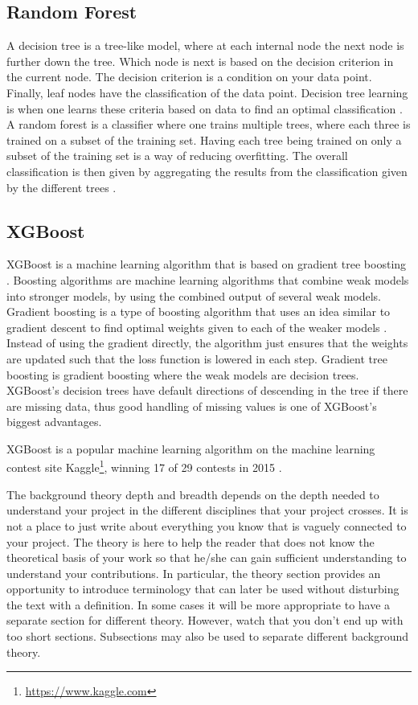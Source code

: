 \subsection{Random Forest}
\label{subsec:random_forest}
A decision tree is a tree-like model, where at each internal node the next node is further down the tree. Which node is next is based on the decision criterion in the current node. The decision criterion is a condition on your data point. Finally, leaf nodes have the classification of the data point. Decision tree learning is when one learns these criteria based on data to find an optimal classification \citep{els}. A random forest is a classifier where one trains multiple trees, where each three is trained on a subset of the training set. Having each tree being trained on only a subset of the training set is a way of reducing overfitting. The overall classification is then given by aggregating the results from the classification given by the different trees \citep{els}.

\subsection{XGBoost}
\label{subsec:xgboost}
XGBoost is a machine learning algorithm that is based on gradient tree boosting \citep{xgboost}. Boosting algorithms are machine learning algorithms that combine weak models into stronger models, by using the combined output of several weak models. Gradient boosting is a type of boosting algorithm that uses an idea similar to gradient descent to find optimal weights given to each of the weaker models \citep{gradientboosting}. Instead of using the gradient directly, the algorithm just ensures that the weights are updated such that the loss function is lowered in each step. Gradient tree boosting is gradient boosting where the weak models are decision trees. XGBoost's decision trees have default directions of descending in the tree if there are missing data, thus good handling of missing values is one of XGBoost's biggest advantages.

XGBoost is a popular machine learning algorithm on the machine learning contest site Kaggle\footnote{\url{https://www.kaggle.com}}, winning 17 of 29 contests in 2015 \citep{xgboost}.

\iffalse
The background theory depth and breadth depends on the depth needed to understand your project in the different disciplines that your project crosses.  It is not a place to just write about everything you know that is vaguely connected to your project. The theory is here to help the reader that does not know the theoretical basis of your work so that he/she can gain sufficient understanding to understand your contributions. In particular, the theory section provides an opportunity to introduce terminology that can later be used without disturbing the text with a definition.  In some cases it will be more appropriate to have a separate section for different theory. However, watch that you don't end up with too short sections. Subsections may also be used to separate different background theory. 

